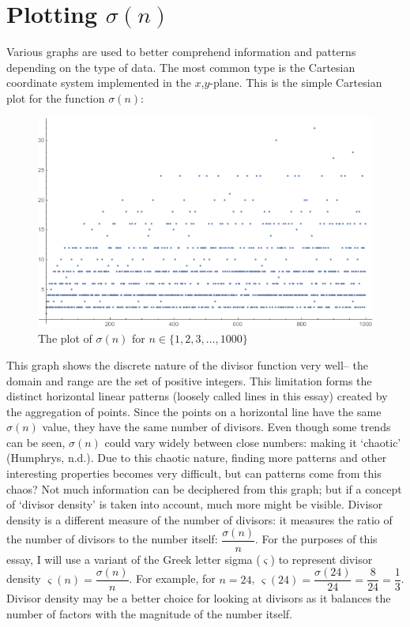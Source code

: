 \documentclass[12pt]{article}
\begin{document}
	\section{Plotting $\sigma(n)$}
		Various graphs are used to better comprehend information and patterns depending on the type of data. The most common type is the Cartesian coordinate system implemented in the $x$,$y$-plane.
		This is the simple Cartesian plot for the function $\sigma(n)$:
		\begin{figure}[H]
			\includegraphics[width=\textwidth]{../Images/nonlogsigma.png}
			\caption{The plot of $\sigma(n)$ for $n\in\{1,2,3,\ldots,1000\}$\label{plainsig}}
		\end{figure}
		This graph shows the discrete nature of the divisor function very well-- the domain and range are the set of positive integers. This limitation forms the distinct horizontal linear patterns (loosely called lines in this essay) created by the aggregation of points. Since the points on a horizontal line have the same $\sigma(n)$ value, they have the same number of divisors. Even though some trends can be seen, $\sigma(n)$ could vary widely between close numbers: making it `chaotic' (Humphrys, n.d.). Due to this chaotic nature, finding more patterns and other interesting properties becomes very difficult, but can patterns come from this chaos? Not much information can be deciphered from this graph; but if a concept of `divisor density' is taken into account, much more might be visible. Divisor density is a different measure of the number of divisors: it measures the ratio of the number of divisors to the number itself: $\dfrac{\sigma(n)}{n}$. For the purposes of this essay, I will use a variant of the Greek letter sigma ($\varsigma$) to represent divisor density $\varsigma(n)=\dfrac{\sigma(n)}{n}$. For example, for $n=24$, $\varsigma(24)=\dfrac{\sigma(24)}{24}=\dfrac{8}{24}=\dfrac{1}{3}$. Divisor density may be a better choice for looking at divisors as it balances the number of factors with the magnitude of the number itself.
\end{document}
